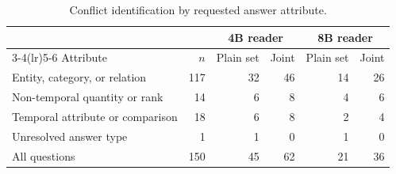 \begin{table}[pos=H]
\caption{Conflict identification by requested answer attribute.}\label{tab:types}
\centering\small
\setlength{\tabcolsep}{6pt}
\begin{tabular}{lrrrrr}
\toprule
& & \multicolumn{2}{c}{4B reader} & \multicolumn{2}{c}{8B reader} \\ \cmidrule(lr){3-4}\cmidrule(lr){5-6} Attribute & $n$ & Plain set & Joint & Plain set & Joint \\
\midrule
Entity, category, or relation & 117 & 32 & 46 & 14 & 26 \\
Non-temporal quantity or rank & 14 & 6 & 8 & 4 & 6 \\
Temporal attribute or comparison & 18 & 6 & 8 & 2 & 4 \\
Unresolved answer type & 1 & 1 & 0 & 1 & 0 \\
All questions & 150 & 45 & 62 & 21 & 36 \\
\bottomrule
\end{tabular}
\end{table}
